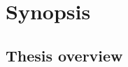 

	\newcommand{\relevance}{\underline{\textbf{\relevanceTXT}}}
	\newcommand{\goal}{\underline{\textbf{\goalTXT}}}
	\newcommand{\scientifictasks}{\underline{\textbf{\scientifictasksTXT}}}
	\newcommand{\scientificnovelty}{\underline{\textbf{\scientificnoveltyTXT}}}
	\newcommand{\importance}{\underline{\textbf{\importanceTXT}}}
	\newcommand{\statements}{\underline{\textbf{\statementsTXT}}}
	\newcommand{\validity}{\underline{\textbf{\validityTXT}}}
	\newcommand{\approbation}{\underline{\textbf{\approbationTXT}}}
	\newcommand{\implementation}{\underline{\textbf{\implementationTXT}}}
	\newcommand{\refs}{\underline{\textbf{\refsTXT}}}
\chapter*{Synopsis}
\section*{Thesis overview}

